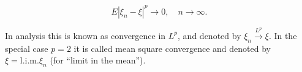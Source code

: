$$E |\xi_n - \xi|^p \to 0, \quad n \to \infty.$$

In analysis this is known as convergence in $L^p$, and denoted by $\xi_n \xrightarrow{L^p} \xi$. In the special case $p = 2$ it is called mean square convergence and denoted by $\xi = \text{l.i.m.} \xi_n$ (for “limit in the mean”).
